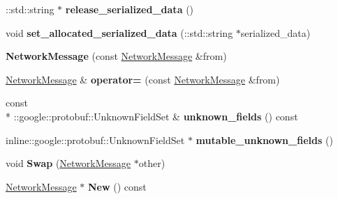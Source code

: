 \begin{DoxyCompactItemize}
\item 
\hypertarget{classSimpleChat_1_1NetworkMessage_a9f1c91bc27b77861710ccec760e13408}{\-::std\-::string $\ast$ {\bfseries release\-\_\-serialized\-\_\-data} ()}\label{classSimpleChat_1_1NetworkMessage_a9f1c91bc27b77861710ccec760e13408}

\item 
\hypertarget{classSimpleChat_1_1NetworkMessage_ae47d82ed0348f240dfd418dcacd9f8da}{void {\bfseries set\-\_\-allocated\-\_\-serialized\-\_\-data} (\-::std\-::string $\ast$serialized\-\_\-data)}\label{classSimpleChat_1_1NetworkMessage_ae47d82ed0348f240dfd418dcacd9f8da}

\item 
\hypertarget{classSimpleChat_1_1NetworkMessage_adb9c3990b39bd7fa4d21fe1fe3710230}{{\bfseries Network\-Message} (const \hyperlink{classSimpleChat_1_1NetworkMessage}{Network\-Message} \&from)}\label{classSimpleChat_1_1NetworkMessage_adb9c3990b39bd7fa4d21fe1fe3710230}

\item 
\hypertarget{classSimpleChat_1_1NetworkMessage_a2ca0a232b03313c7150c3cdf295b2fd3}{\hyperlink{classSimpleChat_1_1NetworkMessage}{Network\-Message} \& {\bfseries operator=} (const \hyperlink{classSimpleChat_1_1NetworkMessage}{Network\-Message} \&from)}\label{classSimpleChat_1_1NetworkMessage_a2ca0a232b03313c7150c3cdf295b2fd3}

\item 
\hypertarget{classSimpleChat_1_1NetworkMessage_aff73981217a39c278a2f2eb74a938d77}{const \\*
\-::google\-::protobuf\-::\-Unknown\-Field\-Set \& {\bfseries unknown\-\_\-fields} () const }\label{classSimpleChat_1_1NetworkMessage_aff73981217a39c278a2f2eb74a938d77}

\item 
\hypertarget{classSimpleChat_1_1NetworkMessage_a7d2913fbffd9f3bbf4c4c6f8c0688996}{inline\-::google\-::protobuf\-::\-Unknown\-Field\-Set $\ast$ {\bfseries mutable\-\_\-unknown\-\_\-fields} ()}\label{classSimpleChat_1_1NetworkMessage_a7d2913fbffd9f3bbf4c4c6f8c0688996}

\item 
\hypertarget{classSimpleChat_1_1NetworkMessage_a2ee30e7f81715ebabb0da01058268964}{void {\bfseries Swap} (\hyperlink{classSimpleChat_1_1NetworkMessage}{Network\-Message} $\ast$other)}\label{classSimpleChat_1_1NetworkMessage_a2ee30e7f81715ebabb0da01058268964}

\item 
\hypertarget{classSimpleChat_1_1NetworkMessage_ad8480eec6be5086ffd63ccbfb0f2ae27}{\hyperlink{classSimpleChat_1_1NetworkMessage}{Network\-Message} $\ast$ {\bfseries New} () const }\label{classSimpleChat_1_1NetworkMessage_ad8480eec6be5086ffd63ccbfb0f2ae27}


\end{DoxyCompactItemize}
